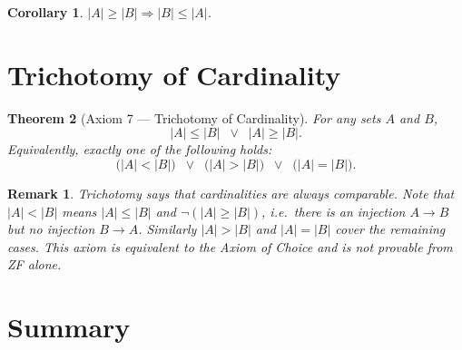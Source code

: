 \documentclass[11pt]{article}
\theoremstyle{defstyle}
\theoremstyle{thmstyle}
\newtheorem{theorem}{Theorem}[section]
\newtheorem{corollary}[theorem]{Corollary}
\theoremstyle{notstyle}
\newtheorem*{remark}{Remark}
\theoremstyle{cautionstyle}
\begin{document}
\begin{thmbox}
\begin{corollary}
$|A| \geq |B| \Rightarrow |B| \leq |A|$.
\end{corollary}
\end{thmbox}

\section{Trichotomy of Cardinality}

\begin{thmbox}
\begin{theorem}[Axiom 7 --- Trichotomy of Cardinality]
For any sets $A$ and $B$,
\[
  |A| \leq |B| \;\;\lor\;\; |A| \geq |B|.
\]
Equivalently, exactly one of the following holds:
\[
  \bigl(|A| < |B|\bigr) \;\;\lor\;\; \bigl(|A| > |B|\bigr) \;\;\lor\;\; \bigl(|A| = |B|\bigr).
\]
\end{theorem}
\end{thmbox}

\begin{notebox}
\begin{remark}
Trichotomy says that cardinalities are always comparable.  Note that $|A| < |B|$ means
$|A| \leq |B|$ and $\lnot(|A| \geq |B|)$, i.e.\ there is an injection $A \to B$ but
no injection $B \to A$.  Similarly $|A| > |B|$ and $|A| = |B|$ cover the remaining
cases. This axiom is equivalent to the Axiom of Choice and is not provable from ZF
alone.
\end{remark}
\end{notebox}

\section{Summary}
\end{document}

